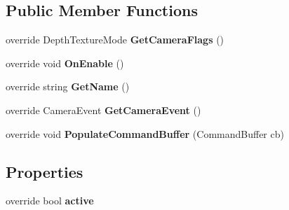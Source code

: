 \subsection*{Public Member Functions}
\begin{DoxyCompactItemize}
\item 
\mbox{\label{class_unity_engine_1_1_post_processing_1_1_screen_space_reflection_component_aeaa198759ea4fae9a6ee5feac84730fa}} 
override Depth\+Texture\+Mode {\bfseries Get\+Camera\+Flags} ()
\item 
\mbox{\label{class_unity_engine_1_1_post_processing_1_1_screen_space_reflection_component_a0d58b4de3e36450e06df20a4de6bd84c}} 
override void {\bfseries On\+Enable} ()
\item 
\mbox{\label{class_unity_engine_1_1_post_processing_1_1_screen_space_reflection_component_ad4da13965c3b67798e594134f70505e3}} 
override string {\bfseries Get\+Name} ()
\item 
\mbox{\label{class_unity_engine_1_1_post_processing_1_1_screen_space_reflection_component_a696726c8892304b37695a69c900b2b97}} 
override Camera\+Event {\bfseries Get\+Camera\+Event} ()
\item 
\mbox{\label{class_unity_engine_1_1_post_processing_1_1_screen_space_reflection_component_a816b26c983d2e6b8723a049dafa72544}} 
override void {\bfseries Populate\+Command\+Buffer} (Command\+Buffer cb)
\end{DoxyCompactItemize}
\subsection*{Properties}
\begin{DoxyCompactItemize}
\item 
\mbox{\label{class_unity_engine_1_1_post_processing_1_1_screen_space_reflection_component_aa8700a0b57b1a9d4a9d928af7fb3fbad}} 
override bool {\bfseries active}
\end{DoxyCompactItemize}
